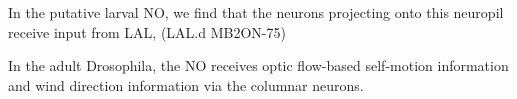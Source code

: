 
In the putative larval NO, we find that the neurons projecting onto this neuropil receive input from LAL, (LAL.d MB2ON-75)





In the adult Drosophila, the NO receives optic flow-based self-motion information and wind direction information via the columnar neurons. %

